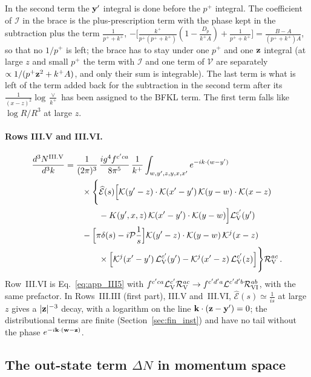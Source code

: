 In the second term the $\mathbf{y}'$ integral is done before the $p^+$ integral. The coefficient of $\mathcal I$ in the brace is the plus-prescription term with the phase kept in the subtraction plus the term $\frac{1}{p^++k^+}$, $-\big[\frac{k^+}{p^+(p^++k^+)}(1-\frac{D_p}{k^+A})+\frac{1}{p^++k^+}\big]=\frac{B-A}{(p^++k^+)A}$, so that no $1/p^+$ is left; the brace has to stay under one $p^+$ and one $\mathbf{z}$ integral (at large $z$ and small $p^+$ the term with $\mathcal I$ and one term of $\mathcal V$ are separately $\propto1/(p^+\mathbf{z}^2+k^+A)$, and only their sum is integrable). The last term is what is left of the term added back for the subtraction in the second term after its $\frac{1}{(x-z)^2}\log\frac{\vee}{k^+}$ has been assigned to the BFKL term. The first term falls like $\log R/R^3$ at large $z$.

\paragraph{Rows III.V and III.VI.}
\begin{align}\label{eq:app_III5}
\frac{d^3N^{\rm III.V}}{d^3k}&=\frac{1}{(2\pi)^3}\,\frac{ig^4f^{c'ca}}{8\pi^5}\,\frac{1}{k^+}\int_{w,y',z,y,x,x'}e^{-ik\cdot(w-y')}\notag\\
&\qquad\times\Bigg\{\widehat{\mathcal E}(s)\Big[\mathcal{K}(y'-z)\cdot\mathcal{K}(x'-y')\,\mathcal{K}(y-w)\cdot\mathcal{K}(x-z)\notag\\&\qquad\qquad-K(y',x,z)\,\mathcal{K}(x'-y')\cdot\mathcal{K}(y-w)\Big]\mathcal L_{\rm V}^{c'}(y')\notag\\
&\qquad-\Big[\pi\delta(s)-i\mathcal P\frac1s\Big]\mathcal{K}(y'-z)\cdot\mathcal{K}(y-w)\,\mathcal{K}^j(x-z)\notag\\
&\qquad\qquad\times\Big[\mathcal{K}^j(x'-y')\,\mathcal L_{\rm V}^{c'}(y')-\mathcal{K}^j(x'-z)\,\mathcal L_{\rm V}^{c'}(z)\Big]\Bigg\}\mathcal R_{\rm V}^{ac}\,.
\end{align}
Row~III.VI is Eq.~\eqref{eq:app_III5} with $f^{c'ca}\mathcal L_{\rm V}^{c'}\mathcal R_{\rm V}^{ac}\to f^{c'd'a}\mathcal L^{c'd'b}\mathcal R_{\rm VI}^{ab}$, with the same prefactor. In Rows~III.III (first part), III.V and~III.VI, $\widehat{\mathcal E}(s)\simeq\frac{1}{is}$ at large $z$ gives a $|\mathbf{z}|^{-3}$ decay, with a logarithm on the line $\mathbf{k}\cdot(\mathbf{z}-\mathbf{y}')=0$; the distributional terms are finite (Section~\ref{sec:fin_inst}) and have no tail without the phase $e^{-i\mathbf{k}\cdot(\mathbf{w}-\mathbf{z})}$.

\subsection{The out-state term \texorpdfstring{$\Delta N$}{Delta N} in momentum space}\label{app:DNmom}

